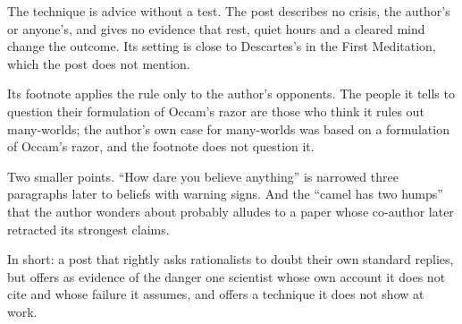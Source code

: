 \begin{afterword}
The technique is advice without a test. The post describes no crisis, the author's or anyone's, and gives no evidence that rest, quiet hours and a cleared mind change the outcome. Its setting is close to Descartes's in the First Meditation, which the post does not mention.

Its footnote applies the rule only to the author's opponents. The people it tells to question their formulation of Occam's razor are those who think it rules out many-worlds; the author's own case for many-worlds was based on a formulation of Occam's razor, and the footnote does not question it.

Two smaller points. ``How dare you believe anything'' is narrowed three paragraphs later to beliefs with warning signs. And the ``camel has two humps'' that the author wonders about probably alludes to a paper whose co-author later retracted its strongest claims.

In short: a post that rightly asks rationalists to doubt their own standard replies, but offers as evidence of the danger one scientist whose own account it does not cite and whose failure it assumes, and offers a technique it does not show at work.
\end{afterword}
